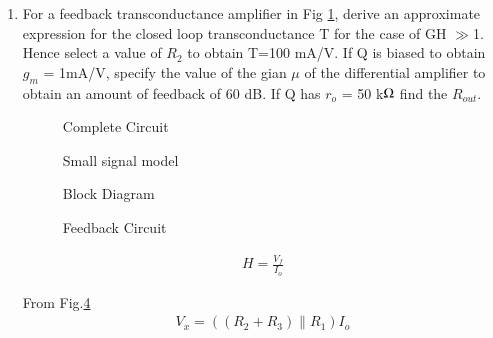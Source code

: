 \begin{enumerate}[label=\arabic*.,ref=\theenumi]

\item For a feedback transconductance amplifier in Fig \ref{fig:fig1}, derive an approximate expression for the closed loop transconductance T for the case of GH $\gg$1. Hence select a value of $R_2$ to obtain T=100 mA/V. If Q is biased to obtain $g_m$ = 1mA/V, specify  the value of the gian $\mu$ of the differential amplifier to obtain an amount of feedback of 60 dB. If Q has $r_o$ = 50 k$\ohm$ find the $R_{out}$.

\begin{figure}[!ht]
	\begin{center}
		\resizebox{\columnwidth}{!}{}
	\end{center}
\caption{Complete Circuit}
\label{fig:fig1}
\end{figure}


\begin{figure}[!ht]
	\begin{center}
		\resizebox{\columnwidth}{!}{}
	\end{center}
\caption{Small signal model}
\label{fig:fig2}
\end{figure}



\begin{figure}[!ht]
	\begin{center}
		\resizebox{\columnwidth}{!}{}
	\end{center}
\caption{Block Diagram}
\label{fig:fig3}
\end{figure}


\begin{figure}[!ht]
	\begin{center}
		\resizebox{\columnwidth}{!}{}
	\end{center}
\caption{Feedback Circuit}
\label{fig:fig4}
\end{figure}




\begin{align}
H = \frac{V_f}{I_o}
\label{eq: eq1}
\end{align}

From Fig.\ref{fig:fig4}
\begin{align}
    V_x = ((R_2 + R_3) \| R_1) I_o 
    \label{eq: eq2}
\end{align} 


\end{enumerate}
